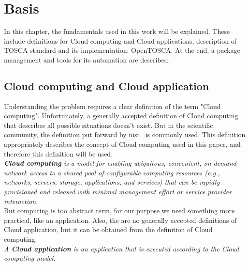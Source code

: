 
\chapter{Basis}
\label{chap:basis}
In this chapter, the fundamentals used in this work will be explained.
These include definitions for Cloud computing and Cloud applications, description of TOSCA standard and its implementation: OpenTOSCA.
At the end, a package management and tools for its automation are described.
\section{Cloud computing and Cloud application} \label{sec:cloud}
Understanding the problem requires a clear definition of the term "Cloud computing".
Unfortunately, a generally accepted definition of Cloud computing that describes all possible situations doesn't exist. 
But in the scientific community, the definition put forward by \gls{nist}~\cite*{wwwnist} is commonly used. 
This definition appropriately describes the concept of Cloud computing used in this paper, and therefore this definition will be used.\\
\emph{\textbf{Cloud computing}\label{def:nist} is a model for enabling ubiquitous, convenient, on-demand network access to a shared pool of configurable computing resources (e.g., networks, servers, storage, applications, and services) that can be rapidly provisioned and released with minimal management effort or service provider interaction.}~\cite*{nist}\\
But computing is too abstract term, for our purpose we need something more practical, like an application.
Also, the are no generally accepted definitions of Cloud application, but it can be obtained from the definition of Cloud computing.\\
\emph{A \textbf{Cloud application}\label{def:capp} is an application that is executed according to the Cloud computing model.} \\%
